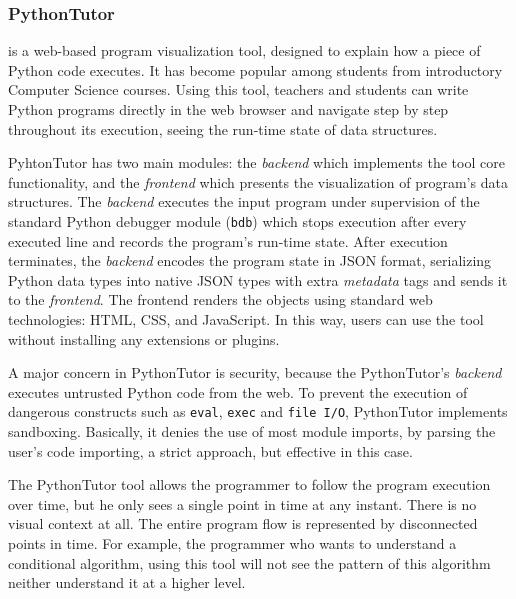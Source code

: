 \subsubsection{PythonTutor~\cite{GuoSIGCSE2013}} is a web-based program visualization tool, designed to explain how a piece of Python code executes. It has become popular among students from introductory Computer Science courses. Using this tool, teachers and students can write Python programs directly in the web browser and navigate step by step throughout its execution, seeing the run-time state of data structures.

PyhtonTutor has two main modules: the \textit{backend} which implements the tool core functionality, and the \textit{frontend} which presents the visualization of program's data structures. The \textit{backend} executes the input program under supervision of the standard Python debugger module (\texttt{bdb}) which stops execution after every executed line and records the program's run-time state. After execution terminates, the \textit{backend} encodes the program state in JSON format, serializing Python data types into native JSON types with extra \textit{metadata} tags and sends it to the \textit{frontend}. The frontend renders the objects using standard web technologies: HTML, CSS, and JavaScript. In this way, users can use the tool without installing any extensions or plugins.

A major concern in PythonTutor is security, because the PythonTutor's \textit{backend} executes untrusted Python code from the web. To prevent the execution of dangerous constructs such as {\tt eval}, {\tt exec} and {\tt file I/O}, PythonTutor implements sandboxing. Basically, it denies the use of most module imports, by parsing the user's code importing, a strict approach, but effective in this case.

The PythonTutor tool allows the programmer to follow the program execution over time, but he only sees a single point in time at any instant. There is no visual context at all. The entire program flow is represented by disconnected points in time. For example, the programmer who wants to understand a conditional algorithm, using this tool will not see the pattern of this algorithm neither understand it at a higher level.
